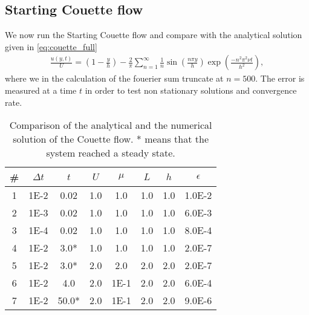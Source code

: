 \documentclass[a4paper,10pt]{article}
\renewcommand{\(}{\left(}
\renewcommand{\)}{\right)}
\begin{document}
\subsection{Starting Couette flow}
We now run the Starting Couette flow and compare with the analytical solution given in \eqref{eq:couette_full}
\begin{align*}
  \frac{u(y,t)}{U} = \left(1 - \frac{y}{h}\right) - \frac{2}{\pi}\sum_{n=1}^\infty \frac{1}{n} \sin\left(\frac{n\pi y}{h}\right)\exp\left(\frac{-n^2\pi^2 \nu t}{h^2}\right),
\end{align*}
where we in the calculation of the fouerier sum truncate at $n=500$. The error is measured at a time $t$ in order to test non stationary solutions and convergence rate.
\begin{table}[h!]
  \begin{center}
    \begin{tabular}[width=4in]{|c|c|c|c|c|c|c|c|}
      \hline
      \# & $\Delta t$ & $t$  & $U$  & $\mu$ & $L$ & $h$ & $\epsilon$\\ \hline
      1  & 1E-2       & 0.02 & 1.0  & 1.0   & 1.0 & 1.0 & 1.0E-2\\
      2  & 1E-3       & 0.02 & 1.0  & 1.0   & 1.0 & 1.0 & 6.0E-3\\
      3  & 1E-4       & 0.02 & 1.0  & 1.0   & 1.0 & 1.0 & 8.0E-4\\
      4  & 1E-2       & 3.0*  & 1.0  & 1.0   & 1.0 & 1.0 & 2.0E-7\\
      5  & 1E-2       & 3.0*  & 2.0  & 2.0   & 2.0 & 2.0 & 2.0E-7\\
      6  & 1E-2       & 4.0  & 2.0  & 1E-1  & 2.0 & 2.0 & 6.0E-4\\
      7  & 1E-2       & 50.0*  & 2.0  & 1E-1  & 2.0 & 2.0 & 9.0E-6\\
      \hline
    \end{tabular}
  \caption{Comparison of the analytical and the numerical solution of the Couette flow. * means that the system reached a steady state.}
  \label{tab:res_couette}
  \end{center}
\end{table}
\end{document}
